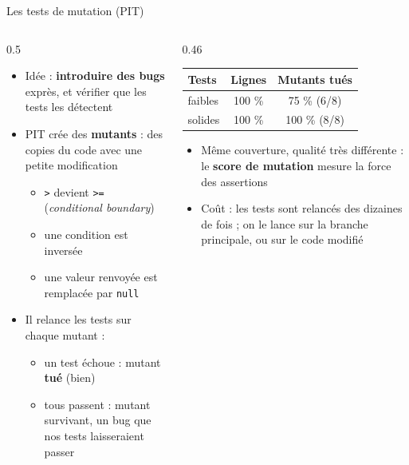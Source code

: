 \documentclass[aspectratio=169,10pt]{beamer}
\begin{document}
\begin{frame}{Les tests de mutation (PIT)}
  \begin{columns}[T]
    \begin{column}{0.5\textwidth}
      \begin{itemize}
        \item Idée : \textbf{introduire des bugs} exprès, et vérifier que les tests les détectent
        \item PIT crée des \textbf{mutants} : des copies du code avec une petite modification
          \begin{itemize}
            \item \texttt{>} devient \texttt{>=} (\textit{conditional boundary})
            \item une condition est inversée
            \item une valeur renvoyée est remplacée par \texttt{null}
          \end{itemize}
        \item Il relance les tests sur chaque mutant :
          \begin{itemize}
            \item un test échoue : mutant \textbf{tué} (bien)
            \item tous passent : mutant \alert{survivant}, un bug que nos tests laisseraient passer
          \end{itemize}
      \end{itemize}
    \end{column}
    \begin{column}{0.46\textwidth}
      \begin{datacard}
        \small
        \begin{tabular}{@{}lcc@{}}
          \toprule
          \textbf{Tests} & \textbf{Lignes} & \textbf{Mutants tués} \\
          \midrule
          faibles & 100 \% & \alert{75 \%} (6/8) \\
          solides & 100 \% & 100 \% (8/8) \\
          \bottomrule
        \end{tabular}
      \end{datacard}
      \small
      \begin{itemize}
        \item Même couverture, qualité très différente : le \textbf{score de mutation} mesure la force des assertions
        \item Coût : les tests sont relancés des dizaines de fois ; on le lance sur la branche principale, ou sur le code modifié
      \end{itemize}
    \end{column}
  \end{columns}
\end{frame}
\end{document}
